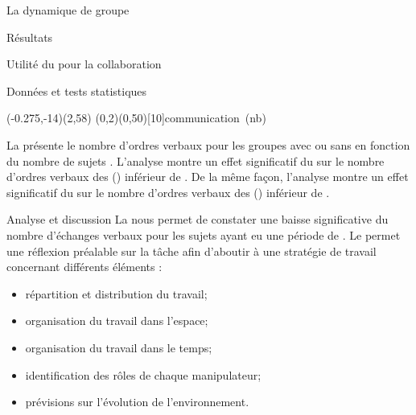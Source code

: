 \documentclass[myfrancais,ngerman,english,frenchb]{mythesis}
\begin{document}
\begin{mychapter}{La dynamique de groupe}
\begin{mysection}{Résultats}
\begin{mysubsection}{Utilité du \mybrainstorming pour la collaboration}
\begin{mysubsubsection}{Données et tests statistiques}
					\begin{myfigure}
						\begin{myps}(-0.275,-14)(2,58)
							\myaxes(0,2){\mybrainstorming}(0,50)[10]{communication~(nb)}
						\end{myps}
					\end{myfigure}

					La  présente le nombre d'ordres verbaux  pour les groupes avec ou sans \mybrainstorming {} en fonction du nombre de sujets .
					L'analyse montre un effet significatif du \mybrainstorming {} sur le nombre d'ordres verbaux  des  () inférieur de .
					De la même façon, l'analyse montre un effet significatif du \mybrainstorming {} sur le nombre d'ordres verbaux  des  () inférieur de .
				\end{mysubsubsection}
				\begin{mysubsubsection}{Analyse et discussion}
					La  nous permet de constater une baisse significative du nombre d'échanges verbaux pour les sujets ayant eu une période de \mybrainstorming.
					Le \mybrainstorming permet une réflexion préalable sur la tâche afin d'aboutir à une stratégie de travail concernant différents éléments :
					\begin{itemize}
						\item répartition et distribution du travail;
						\item organisation du travail dans l'espace;
						\item organisation du travail dans le temps;
						\item identification des rôles de chaque manipulateur;
						\item prévisions sur l'évolution de l'environnement.
					\end{itemize}


\end{mysubsubsection}
\end{mysubsection}
\end{mysection}
\end{mychapter}
\end{document}
